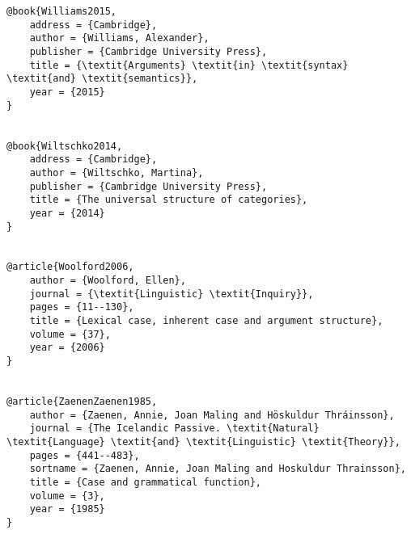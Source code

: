 \documentclass[output=paper,modfonts,nonflat]{langsci/langscibook}
\begin{document}
\begin{verbatim}
@book{Williams2015,
	address = {Cambridge},
	author = {Williams, Alexander},
	publisher = {Cambridge University Press},
	title = {\textit{Arguments} \textit{in} \textit{syntax} \textit{and} \textit{semantics}},
	year = {2015}
}


@book{Wiltschko2014,
	address = {Cambridge},
	author = {Wiltschko, Martina},
	publisher = {Cambridge University Press},
	title = {The universal structure of categories},
	year = {2014}
}


@article{Woolford2006,
	author = {Woolford, Ellen},
	journal = {\textit{Linguistic} \textit{Inquiry}},
	pages = {11--130},
	title = {Lexical case, inherent case and argument structure},
	volume = {37},
	year = {2006}
}


@article{ZaenenZaenen1985,
	author = {Zaenen, Annie, Joan Maling and Höskuldur Thráinsson},
	journal = {The Icelandic Passive. \textit{Natural} \textit{Language} \textit{and} \textit{Linguistic} \textit{Theory}},
	pages = {441--483},
	sortname = {Zaenen, Annie, Joan Maling and Hoskuldur Thrainsson},
	title = {Case and grammatical function},
	volume = {3},
	year = {1985}
}


\end{verbatim}
\sloppy\printbibliography[heading=subbibliography,notkeyword=this]
\end{document}
